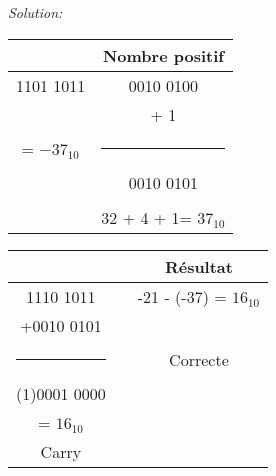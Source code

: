 \documentclass{article}
\newenvironment{solution}
    {\textit{Solution:}}
    {}
\begin{document}
\begin{solution}
\begin{enumerate}
        \begin{tabular}{|c|c|}
        \hline
        & Nombre positif\\
        \hline    
        1101 1011                   &       0010 0100           \\
                                    &       + \hspace{25pt} 1   \\
        = $-37_{10}$  &       \rule{1in}{1pt}     \\
        \hspace{5pt}                &       0010 0101           \\
        \hspace{100pt}              &       \hspace{100pt}      \\
                                    &       32 + 4 + 1= $37_{10}$\\
        \hline
        \end{tabular}
        
        \hspace{40pt}
        
        \begin{tabular}{|c|c|c|}
        \hline
        &  & Résultat \\
        \hline
        \hspace{6pt}1110 1011       &                          &       -21 - (-37) = $16_{10}$         \\
        +0010 0101                  &        \hspace{25pt}            &                                         \\
        \rule{1in}{1pt}             &                  &       Correcte                          \\
        (1)0001 0000                &                          &                                         \\
        \hspace{33pt} = $16_{10}$ \hspace{30pt}  &       &                                   \\
        Carry                       &       \hspace{100pt}              &      \hspace{100pt}                     \\
        \hline
        \end{tabular}
        

\end{enumerate}
\end{solution}
\end{document}
